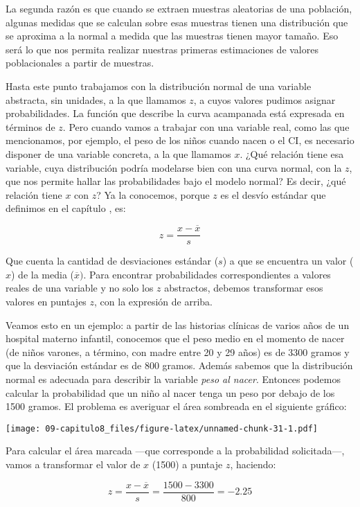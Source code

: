 \documentclass[]{article}
\begin{document}
La segunda razón es que cuando se extraen muestras aleatorias de una
población, algunas medidas que se calculan sobre esas muestras tienen
una distribución que se aproxima a la normal a medida que las muestras
tienen mayor tamaño. Eso será lo que nos permita realizar nuestras
primeras estimaciones de valores poblacionales a partir de muestras.

Hasta este punto trabajamos con la distribución normal de una variable
abstracta, sin unidades, a la que llamamos \(z\), a cuyos valores
pudimos asignar probabilidades. La función que describe la curva
acampanada está expresada en términos de \(z\). Pero cuando vamos a
trabajar con una variable real, como las que mencionamos, por ejemplo,
el peso de los niños cuando nacen o el CI, es necesario disponer de una
variable concreta, a la que llamamos \(x\). ¿Qué relación tiene esa
variable, cuya distribución podría modelarse bien con una curva normal,
con la \(z\), que nos permite hallar las probabilidades bajo el modelo
normal? Es decir, ¿qué relación tiene \(x\) con \(z\)? Ya la conocemos,
porque \(z\) es el desvío estándar que definimos en el capítulo , es:

\[z = \frac{x - \overline{x}}{s}\]

Que cuenta la cantidad de desviaciones estándar (\(s\)) a que se
encuentra un valor (\(x\)) de la media (\(\overline{x})\). Para
encontrar probabilidades correspondientes a valores reales de una
variable y no solo los \(z\) abstractos, debemos transformar esos
valores en puntajes \(z\), con la expresión de arriba.

Veamos esto en un ejemplo: a partir de las historias clínicas de varios
años de un hospital materno infantil, conocemos que el peso medio en el
momento de nacer (de niños varones, a término, con madre entre 20 y 29
años) es de 3300 gramos y que la desviación estándar es de 800 gramos.
Además sabemos que la distribución normal es adecuada para describir la
variable \emph{peso al nacer}. Entonces podemos calcular la probabilidad
que un niño al nacer tenga un peso por debajo de los 1500 gramos. El
problema es averiguar el área sombreada en el siguiente gráfico:

\texttt{[image: 09-capitulo8\_files/figure-latex/unnamed-chunk-31-1.pdf]}

Para calcular el área marcada ---que corresponde a la probabilidad
solicitada---, vamos a transformar el valor de \(x\) (1500) a puntaje
\(z\), haciendo:

\[z = \frac{x - \overline{x}}{s} = \frac{1500 - 3300}{800} = - 2.25\]
\end{document}
